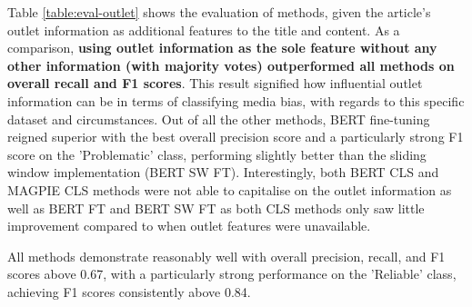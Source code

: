 Table \ref{table:eval-outlet} shows the evaluation of methods, given the article's outlet information as additional features to the title and content. As a comparison, \textbf{using outlet information as the sole feature without any other information (with majority votes) outperformed all methods on overall recall and F1 scores}. This result signified how influential outlet information can be in terms of classifying media bias, with regards to this specific dataset and circumstances. Out of all the other methods, BERT fine-tuning reigned superior with the best overall precision score and a particularly strong F1 score on the 'Problematic' class, performing slightly better than the sliding window implementation (BERT SW FT). Interestingly, both BERT CLS and MAGPIE CLS methods were not able to capitalise on the outlet information as well as BERT FT and BERT SW FT as both CLS methods only saw little improvement compared to when outlet features were unavailable.

All methods demonstrate reasonably well with overall precision, recall, and F1 scores above 0.67, with a particularly strong performance on the 'Reliable' class, achieving F1 scores consistently above 0.84.


